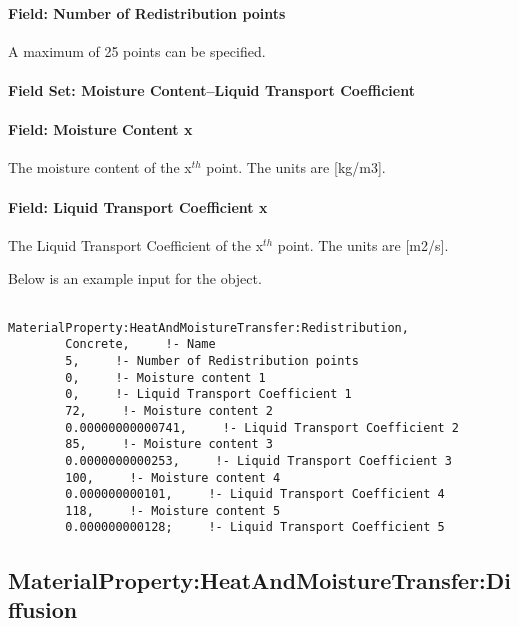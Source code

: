 \paragraph{Field: Number of Redistribution points}\label{field-number-of-redistribution-points}

A maximum of 25 points can be specified.

\paragraph{Field Set: Moisture Content--Liquid Transport Coefficient}\label{field-set-moisture-content-liquid-transport-coefficient-1}

\paragraph{Field: Moisture Content x}\label{field-moisture-content-x-2}

The moisture content of the x\(^{th}\) point. The units are {[}kg/m3{]}.

\paragraph{Field: Liquid Transport Coefficient x}\label{field-liquid-transport-coefficient-x-1}

The Liquid Transport Coefficient of the x\(^{th}\) point. The units are {[}m2/s{]}.

Below is an example input for the object.

\begin{lstlisting}

MaterialProperty:HeatAndMoistureTransfer:Redistribution,
        Concrete,     !- Name
        5,     !- Number of Redistribution points
        0,     !- Moisture content 1
        0,     !- Liquid Transport Coefficient 1
        72,     !- Moisture content 2
        0.00000000000741,     !- Liquid Transport Coefficient 2
        85,     !- Moisture content 3
        0.0000000000253,     !- Liquid Transport Coefficient 3
        100,     !- Moisture content 4
        0.000000000101,     !- Liquid Transport Coefficient 4
        118,     !- Moisture content 5
        0.000000000128;     !- Liquid Transport Coefficient 5
\end{lstlisting}

\subsection{MaterialProperty:HeatAndMoistureTransfer:Diffusion}\label{materialpropertyheatandmoisturetransferdiffusion}

